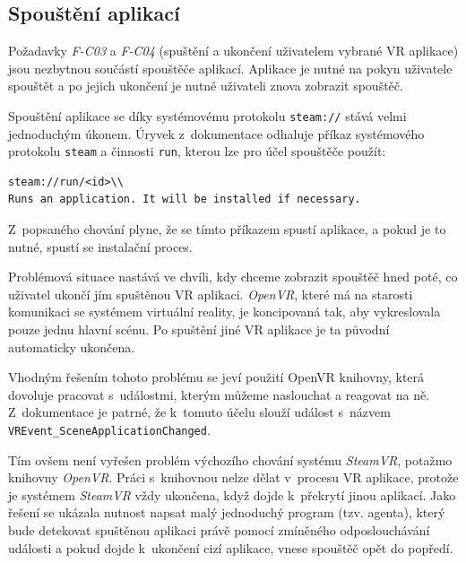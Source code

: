 \subsection{Spouštění
aplikací}\label{spouux161tux11bnuxed-aplikacuxed}

Požadavky \emph{F-C03} a \emph{F-C04} (spuštění a ukončení uživatelem
vybrané VR aplikace) jsou nezbytnou součástí spouštěče
aplikací. Aplikace je nutné na pokyn uživatele spouštět a po jejich ukončení 
je nutné uživateli znova zobrazit spouštěč.

Spouštění aplikace se díky systémovému protokolu \texttt{steam://} stává
velmi jednoduchým úkonem. Úryvek z~dokumentace \autocite{protocoldocs} odhaluje příkaz
systémového protokolu \texttt{steam} a činnosti \texttt{run}, kterou lze
pro účel spouštěče použít:

\begin{verbatim}
steam://run/<id>\\
Runs an application. It will be installed if necessary.
\end{verbatim}

Z~popsaného chování plyne, že se tímto příkazem spustí aplikace, a pokud je
to nutné, spustí se instalační proces. 

Problémová situace nastává ve
chvíli, kdy chceme zobrazit spouštěč hned poté, co uživatel
ukončí jím spuštěnou VR aplikaci. \emph{OpenVR}, které má na starosti
komunikaci se systémem virtuální reality, je koncipovaná tak, 
aby vykreslovala pouze jednu hlavní scénu. Po spuštění jiné VR aplikace 
je ta původní automaticky ukončena.

Vhodným řešením tohoto problému se jeví použití OpenVR knihovny, která
dovoluje pracovat s~událostmi, kterým můžeme naslouchat a reagovat na
ně. Z~dokumentace \autocite{openvrdocs} je patrné, že k~tomuto účelu slouží událost s~názvem
\texttt{VREvent\_SceneApplicationChanged}. 

Tím ovšem není vyřešen
problém výchozího chování systému \emph{SteamVR}, potažmo knihovny
\emph{OpenVR}. Práci s~knihovnou nelze dělat v~procesu VR aplikace,
protože je systémem \emph{SteamVR} vždy ukončena, když dojde
k~překrytí jinou aplikací. Jako řešení se ukázala nutnost napsat malý 
jednoduchý program (tzv. agenta), který bude detekovat spuštěnou aplikaci právě
pomocí zmíněného odposlouchávání události a pokud dojde k~ukončení cizí 
aplikace, vnese spouštěč opět do popředí.


